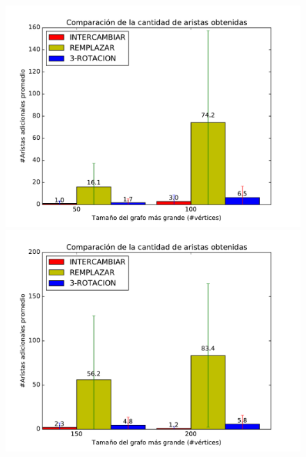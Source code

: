\begin{figure}[H]
\centering
\begin{minipage}{0.49\textwidth}
  \centering
    \includegraphics[width=1\textwidth]{graficos/problema_6/calidad0.pdf}
  \caption{\footnotesize{}}
  \label{fig:calidad5-1}
\end{minipage}%
\hspace{0.01\textwidth}
\begin{minipage}{0.49\textwidth}   
  \centering
    \includegraphics[width=1\textwidth]{graficos/problema_6/calidad2.pdf} 
  \caption{\footnotesize{}}
  \label{fig:calidad5-2}
\end{minipage}


\end{figure}
